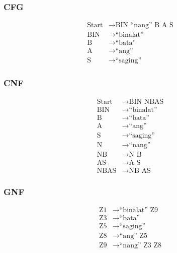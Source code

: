 \subsubsection{CFG}
\begin{equation*}
    \begin{aligned}
        \text{Start}   & \rightarrow \text{BIN “nang” B A S}   \\
        \text{BIN} & \rightarrow \text{“binalat”} \\
        \text{B} & \rightarrow \text{“bata”} \\
        \text{A} & \rightarrow \text{“ang”} \\
        \text{S} & \rightarrow \text{“saging”}
    \end{aligned}
\end{equation*}

\subsubsection{CNF}
\begin{equation*}
    \begin{aligned}
        \text{Start}   & \rightarrow \text{BIN NBAS}   \\
        \text{BIN} & \rightarrow \text{“binalat”} \\
        \text{B} & \rightarrow \text{“bata”} \\
        \text{A} & \rightarrow \text{“ang”} \\
        \text{S} & \rightarrow \text{“saging”} \\
        \text{N} & \rightarrow \text{“nang”} \\
        \text{NB} & \rightarrow \text{N B} \\
        \text{AS} & \rightarrow \text{A S} \\
        \text{NBAS} & \rightarrow \text{NB AS}
    \end{aligned}
\end{equation*}

\subsubsection{GNF}
\begin{equation*}
    \begin{aligned}
        \text{Z1}   & \rightarrow \text{“binalat” Z9}   \\
        \text{Z3} & \rightarrow \text{“bata”} \\
        \text{Z5} & \rightarrow \text{“saging”} \\
        \text{Z8} & \rightarrow \text{“ang” Z5} \\
        \text{Z9} & \rightarrow \text{“nang” Z3 Z8}
    \end{aligned}
\end{equation*}


